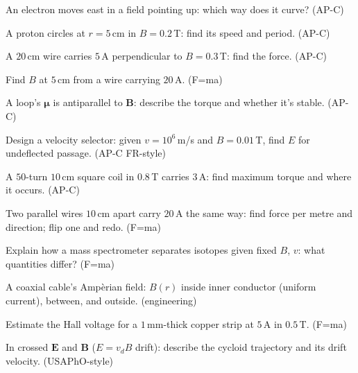 \begin{exercise}[easy]
An electron moves east in a field pointing up: which way does it
curve? (AP-C)
\end{exercise}
\begin{exercise}[easy]
A proton circles at $r=5$\,cm in $B=0.2$\,T: find its speed and
period. (AP-C)
\end{exercise}
\begin{exercise}[easy]
A $20$\,cm wire carries $5$\,A perpendicular to $B=0.3$\,T: find the
force. (AP-C)
\end{exercise}
\begin{exercise}[easy]
Find $B$ at $5$\,cm from a wire carrying $20$\,A. (F=ma)
\end{exercise}
\begin{exercise}[easy]
A loop's $\boldsymbol\mu$ is antiparallel to $\mathbf B$: describe the
torque and whether it's stable. (AP-C)
\end{exercise}
\begin{exercise}[medium]
Design a velocity selector: given $v=10^{6}$\,m/s and $B=0.01$\,T,
find $E$ for undeflected passage. (AP-C FR-style)
\end{exercise}
\begin{exercise}[medium]
A $50$-turn $10$\,cm square coil in $0.8$\,T carries $3$\,A: find
maximum torque and where it occurs. (AP-C)
\end{exercise}
\begin{exercise}[medium]
Two parallel wires $10$\,cm apart carry $20$\,A the same way: find
force per metre and direction; flip one and redo. (F=ma)
\end{exercise}
\begin{exercise}[medium]
Explain how a mass spectrometer separates isotopes given fixed $B$,
$v$: what quantities differ? (F=ma)
\end{exercise}
\begin{exercise}[medium]
A coaxial cable's Amp\`erian field: $B(r)$ inside inner conductor
(uniform current), between, and outside. (engineering)
\end{exercise}
\begin{exercise}[medium]
Estimate the Hall voltage for a $1$\,mm-thick copper strip at $5$\,A
in $0.5$\,T. (F=ma)
\end{exercise}
\begin{exercise}[hard]
In crossed $\mathbf E$ and $\mathbf B$ ($E=v_dB$ drift): describe the
cycloid trajectory and its drift velocity. (USAPhO-style)
\end{exercise}
